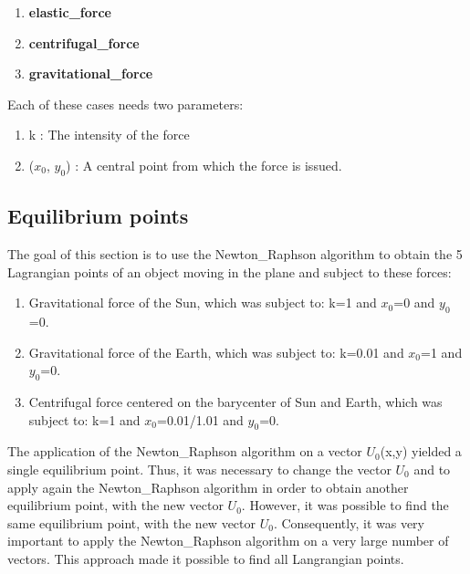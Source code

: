 \documentclass{article}
\begin{document}
\begin{enumerate}
    \item \textbf{elastic\_force}
    \item \textbf{centrifugal\_force}
    \item \textbf{gravitational\_force}
\end{enumerate}
Each of these cases needs two parameters:
\begin{enumerate}
    \item k : The intensity of the force
    \item ($x_{0}$, $y_0$) : A central point from which the force is issued.
\end{enumerate}
\subsection{Equilibrium points}
The goal of this section is to use the Newton\_Raphson algorithm to obtain the 5 Lagrangian points of an object moving in the plane and subject to these forces: 
\begin{enumerate}
    \item Gravitational force of the Sun, which was subject to: k=1 and $x_0$=0 and $y_0$=0.
    
    \item Gravitational force of the Earth, which was subject to: k=0.01 and $x_0$=1 and $y_0$=0.
    \item Centrifugal force centered on the barycenter of Sun and Earth, which was subject to: k=1 and $x_0$=0.01/1.01 and $y_0$=0.
\end{enumerate}
The application of the Newton\_Raphson algorithm on a vector $U_0$(x,y) yielded a single equilibrium point. Thus, it was necessary to change the vector $U_0$ and to apply again the Newton\_Raphson algorithm in order to obtain another equilibrium point, with the new vector $U_0$. However, it was possible to find the same equilibrium point, with the new vector $U_0$. Consequently, it was very important to apply the Newton\_Raphson algorithm on a very large number  of vectors. This approach made it possible to find all Langrangian points.
\newline
\end{document}
